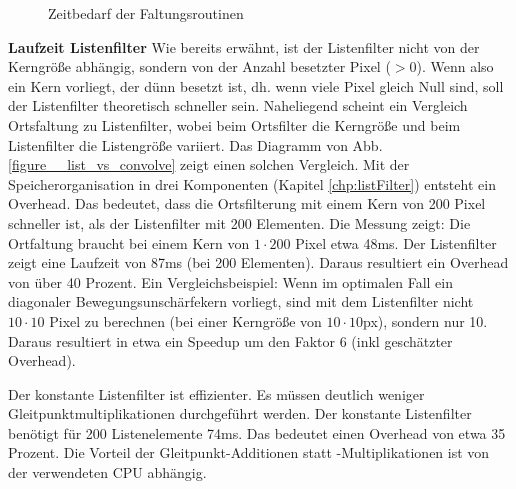 \documentclass[a4paper,12pt]{article}
\begin{document}
\begin{figure}[htbp]
\caption{Zeitbedarf der Faltungsroutinen}%
\label{figure_zeit_faltung}
\end{figure}  
  
 
\textbf{Laufzeit Listenfilter}
Wie bereits erwähnt, ist der Listenfilter nicht von der Kerngröße abhängig,
sondern von der Anzahl besetzter Pixel ($>0$). Wenn also ein Kern vorliegt, der
dünn besetzt ist, dh. wenn viele Pixel gleich Null sind, soll der Listenfilter
theoretisch schneller sein. Naheliegend scheint ein Vergleich Ortsfaltung zu
Listenfilter, wobei beim Ortsfilter die Kerngröße und beim Listenfilter die Listengröße
variiert. Das Diagramm von Abb. \ref{figure__list_vs_convolve} zeigt einen
solchen Vergleich.
Mit der Speicherorganisation in drei Komponenten (Kapitel \ref{chp:listFilter})
entsteht ein Overhead. Das bedeutet, dass die Ortsfilterung mit einem Kern von
200 Pixel schneller ist, als der Listenfilter mit 200 Elementen. Die Messung
zeigt: Die Ortfaltung braucht bei einem Kern von $1 \cdot 200$ Pixel etwa 48ms.
Der Listenfilter zeigt eine Laufzeit von 87ms (bei 200 Elementen). Daraus
resultiert ein Overhead von über 40 Prozent. Ein Vergleichsbeispiel: Wenn im
optimalen Fall ein diagonaler Bewegungsunschärfekern vorliegt, sind mit dem
Listenfilter nicht $10 \cdot 10$ Pixel zu berechnen (bei einer Kerngröße von $10
\cdot 10$px), sondern nur 10. Daraus resultiert in etwa ein Speedup um den
Faktor $6$ (inkl geschätzter Overhead).

Der konstante Listenfilter ist effizienter. Es müssen deutlich weniger
Gleitpunkt\-multiplikationen durchgeführt werden. Der konstante Listenfilter
benötigt für 200 Listenelemente 74ms. Das bedeutet einen Overhead von etwa 35
Prozent. Die Vorteil der Gleitpunkt-Additionen statt -Multiplikationen ist von
der verwendeten CPU abhängig.\\
\end{document}

